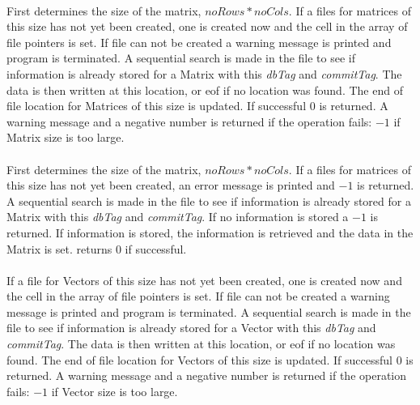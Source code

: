 \\
First determines the size of the matrix, $noRows * noCols$. If a files
for matrices of this size has not yet been created, one is created now
and the cell in the array of file pointers is set. If file can not be
created a warning message is printed and program is terminated. A sequential search
is made in the file to see if information is already stored for a Matrix with
this {\em dbTag} and {\em commitTag}. The data is then written at this
location, or eof if no location was found. The end of file location
for Matrices of this size is updated. If successful $0$ is
returned. A warning message and a negative number is returned if the
operation fails: $-1$ if Matrix size is too large. \\

\\
First determines the size of the matrix, $noRows * noCols$. If a files
for matrices of this size has not yet been created, an error message
is printed and $-1$ is returned.  A sequential search
is made in the file to see if information is already stored for a Matrix with
this {\em dbTag} and {\em commitTag}. If no information is stored a
$-1$ is returned. If information is stored, the information is
retrieved and the data in the Matrix is set. returns $0$ if
successful. \\

\\
If a file
for Vectors of this size has not yet been created, one is created now
and the cell in the array of file pointers is set. If file can not be
created a warning message is printed and program is terminated. A sequential search
is made in the file to see if information is already stored for a Vector with
this {\em dbTag} and {\em commitTag}. The data is then written at this
location, or eof if no location was found. The end of file location
for Vectors of this size is updated. If successful $0$ is
returned. A warning message and a negative number is returned if the
operation fails: $-1$ if Vector size is too large. \\

